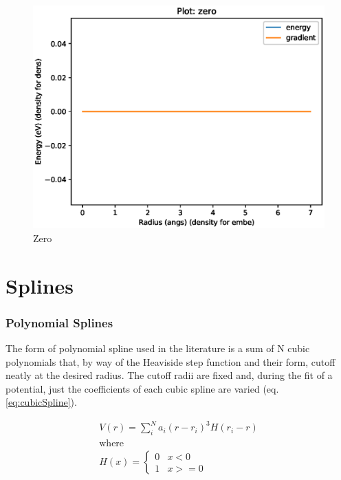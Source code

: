 \FloatBarrier
\begin{figure}[h]
  \begin{center}
    \includegraphics[width=0.7\linewidth]{appendix/functions/pots_plots/zero.eps}
    \caption{Zero}
    \label{figure:functionszero}
  \end{center}
\end{figure}






\FloatBarrier
\section{Splines}

\subsubsection{Polynomial Splines}
\label{section:backgroundpolynomialsplines}

The form of polynomial spline used in the literature is a sum of N cubic polynomials that, by way of the Heaviside step function and their form, cutoff neatly at the desired radius.  The cutoff radii are fixed and, during the fit of a potential, just the coefficients of each cubic spline are varied (eq. \ref{eq:cubicSpline}).

\begin{equation}
\begin{split}
V(r) = \sum_i^N a_i (r - r_i)^3 H(r_i - r) \\
\text{where } \\
H(x) = \left\{ \begin{matrix} 0 & x<0 \\  1 & x >= 0 \end{matrix} \right . 
\end{split}
\label{eq:cubicSpline}
\end{equation}

